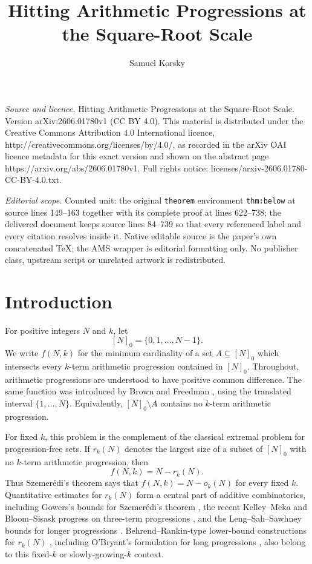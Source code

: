 \documentclass[10pt,a4paper]{amsart}
\numberwithin{equation}{section}
\begin{document}
\title[Hitting Arithmetic Progressions at the Square-Root Scale]{Hitting Arithmetic Progressions at the Square-Root Scale}
\author{Samuel Korsky}
\date{}
\maketitle
\noindent\emph{Source and licence.} Hitting Arithmetic Progressions at the Square-Root Scale. Version arXiv:2606.01780v1 (CC BY 4.0). This material is distributed under the Creative Commons Attribution 4.0 International licence, http://creativecommons.org/licenses/by/4.0/, as recorded in the arXiv OAI licence metadata for this exact version and shown on the abstract page https://arxiv.org/abs/2606.01780v1. Full rights notice: licenses/arxiv-2606.01780-CC-BY-4.0.txt.\par\smallskip
\noindent\textit{Editorial scope.} Counted unit: the original \texttt{theorem} environment \texttt{thm:below} at source lines 149--163 together with its complete proof at lines 622--738; the delivered document keeps source lines 84--739 so that every referenced label and every citation resolves inside it. Native editable source is the paper's own concatenated TeX; the AMS wrapper is editorial formatting only. No publisher class, upstream script or unrelated artwork is redistributed.
\section{Introduction}

For positive integers $N$ and $k$, let
\[
        [N]_0=\{0,1,\ldots,N-1\}.
\]
We write $f(N,k)$ for the minimum cardinality of a set $A\subseteq[N]_0$ which intersects every $k$-term arithmetic progression contained in $[N]_0$.
Throughout, arithmetic progressions are understood to have positive common difference.
The same function was introduced by Brown and Freedman \cite{BrownFreedman}, using the translated interval $\{1,\ldots,N\}$.
Equivalently, $[N]_0\setminus A$ contains no $k$-term arithmetic progression.

For fixed $k$, this problem is the complement of the classical extremal problem for progression-free sets.
If $r_k(N)$ denotes the largest size of a subset of $[N]_0$ with no $k$-term arithmetic progression, then
\[
        f(N,k)=N-r_k(N).
\]
Thus Szemer\'edi's theorem \cite{Szemeredi} says that $f(N,k)=N-o_k(N)$ for every fixed $k$.
Quantitative estimates for $r_k(N)$ form a central part of additive combinatorics, including Gowers's bounds for Szemer\'edi's theorem \cite{Gowers}, the recent Kelley--Meka and Bloom--Sisask progress on three-term progressions \cite{KelleyMeka,BloomSisask}, and the Leng--Sah--Sawhney bounds for longer progressions \cite{LengSahSawhney}.
Behrend--Rankin-type lower-bound constructions for $r_k(N)$ \cite{Behrend,Rankin}, including O'Bryant's formulation for long progressions \cite{OBryant}, also belong to this fixed-$k$ or slowly-growing-$k$ context.
\end{document}
